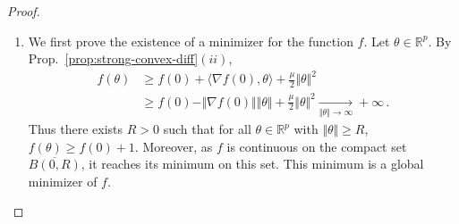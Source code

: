 \documentclass[11pt,reqno]{article}
\newcommand{\R}{\mathbb{R}}
\renewcommand{\geq}{\geqslant}
\numberwithin{equation}{section}
\theoremstyle{plain}
\theoremstyle{definition}
\theoremstyle{remark}
\begin{document}
\begin{proof}
	\begin{enumerate}[label=\itshape(\roman*)]
		\item We first prove the existence of a minimizer for the function $f$. Let $\theta \in \R^p$. By Prop.~\ref{prop:strong-convex-diff}$(ii)$, 
		\begin{align*}
			f(\theta) &\geq f(0) + \langle \nabla f(0), \theta \rangle + \frac{\mu}{2} \Vert \theta \Vert^2 \\
			&\geq f(0) - \Vert \nabla f(0) \Vert \Vert \theta \Vert + \frac{\mu}{2} \Vert \theta \Vert^2 \xrightarrow[\Vert \theta \Vert \to \infty]{} + \infty \, .
		\end{align*}
		Thus there exists $R>0$ such that for all $\theta \in \R^p$ with $\Vert \theta \Vert \geq R$, $f(\theta) \geq f(0) + 1$. Moreover, as $f$ is continuous on the compact set $\overline{B(0,R)}$, it reaches its minimum on this set. This minimum is a global minimizer of $f$.


\end{enumerate}
\end{proof}
\end{document}
